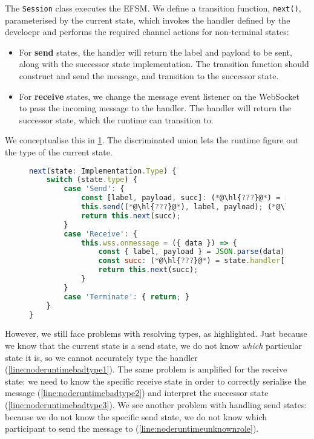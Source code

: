 The \texttt{Session} class executes the EFSM.
We define a transition function, \texttt{next()}, 
parameterised by the current state,
which invokes the handler defined by the develoepr
and performs the required channel actions for non-terminal states:

\begin{itemize}
\item 
For \textbf{send} states, the handler will
return the label and payload to be sent, along with the
successor state implementation. The transition function
should construct and send the message, 
and transition to the successor state.

\item
For \textbf{receive} states, we change the
message event listener on the WebSocket to
pass the incoming message to the handler.
The handler will return the successor state,
which the runtime can transition to.

\end{itemize}

We conceptualise this in \cref{lst:noderuntimesimple}.
The discriminated union lets the runtime figure out
the type of the current state.

\begin{figure}[!h]
\begin{lstlisting}[language=javascript,tabsize=2]
next(state: Implementation.Type) {
	switch (state.type) {
		case 'Send': {
			const [label, payload, succ]: (*@\hl{???}@*) = state.handler;	 (*@\label{line:noderuntimebadtype1}@*)
			this.send((*@\hl{???}@*), label, payload); (*@\label{line:noderuntimeunknownrole}@*)		
			return this.next(succ);
		}
		case 'Receive': {
			this.wss.onmessage = ({ data }) => {
				const { label, payload } = JSON.parse(data) as (*@\hl{???}@*); (*@\label{line:noderuntimebadtype2}@*)
				const succ: (*@\hl{???}@*) = state.handler[label](...payload); (*@\label{line:noderuntimebadtype3}@*)
				return this.next(succ);
			}
		}
		case 'Terminate': { return; }
	}
}
\end{lstlisting}
\label{lst:noderuntimesimple}
\end{figure}

However, we still face problems with resolving types, as highlighted.
Just because we know that the current state is a send state,
we do not know \textit{which} particular state it is,
so we cannot accurately type the handler (\cref{line:noderuntimebadtype1}).
The same problem is amplified for the receive state:
we need to know the specific receive state in order
to correctly serialise the message (\cref{line:noderuntimebadtype2})
and interpret the successor state (\cref{line:noderuntimebadtype3}).
We see another problem with handling send states:
because we do not know the specific send state, we do not know which
participant to send the message to (\cref{line:noderuntimeunknownrole}).

